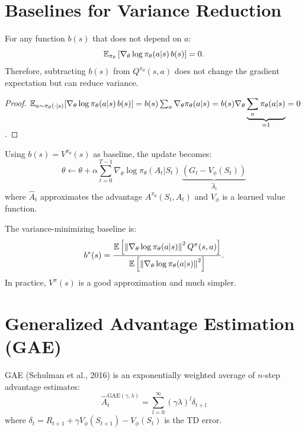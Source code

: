 \section{Baselines for Variance Reduction}
\label{sec:pg:baseline}

\begin{theorem}
\label{thm:baseline}
For any function $b(s)$ that does not depend on $a$:
\[
    \mathbb{E}_{\pi_\theta}\left[\nabla_\theta \log \pi_\theta(a|s) \, b(s)\right] = 0.
\]
Therefore, subtracting $b(s)$ from $Q^{\pi_\theta}(s,a)$ does not change
the gradient expectation but can reduce variance.
\end{theorem}

\begin{proof}
$\mathbb{E}_{a \sim \pi_\theta(\cdot|s)}[\nabla_\theta \log \pi_\theta(a|s) \, b(s)]
= b(s) \sum_a \nabla_\theta \pi_\theta(a|s)
= b(s) \nabla_\theta \underbrace{\sum_a \pi_\theta(a|s)}_{= 1} = 0$.
\end{proof}

\begin{definition}
Using $b(s) = V^{\pi_\theta}(s)$ as baseline, the update becomes:
\[
    \theta \leftarrow \theta + \alpha \sum_{t=0}^{T-1}
    \nabla_\theta \log \pi_\theta(A_t | S_t) \,
    \underbrace{(G_t - V_\phi(S_t))}_{\hat{A}_t}
\]
where $\hat{A}_t$ approximates the advantage $A^{\pi_\theta}(S_t, A_t)$
and $V_\phi$ is a learned value function.
\end{definition}

\begin{proposition}
The variance-minimizing baseline is:
\[
    b^*(s) = \frac{\mathbb{E}\left[\left\| \nabla_\theta \log \pi_\theta(a|s) \right\|^2 Q^{\pi}(s,a)\right]}
    {\mathbb{E}\left[\left\| \nabla_\theta \log \pi_\theta(a|s) \right\|^2\right]}.
\]
In practice, $V^{\pi}(s)$ is a good approximation and much simpler.
\end{proposition}

\section{Generalized Advantage Estimation (GAE)}
\label{sec:gae}

\begin{definition}
GAE (Schulman et al., 2016) is an exponentially weighted average of
$n$-step advantage estimates:
\[
    \hat{A}_t^{\text{GAE}(\gamma, \lambda)} = \sum_{l=0}^{\infty}
    (\gamma \lambda)^l \delta_{t+l}
\]
where $\delta_t = R_{t+1} + \gamma V_\phi(S_{t+1}) - V_\phi(S_t)$ is
the TD error.
\end{definition}

